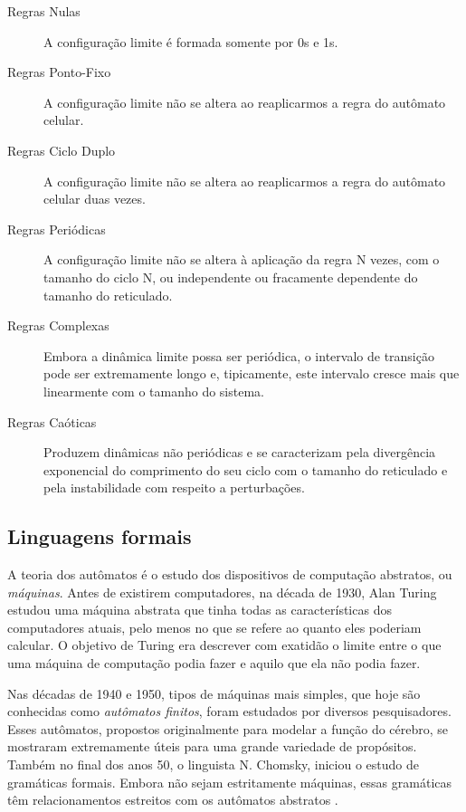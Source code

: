 \documentclass[12pt,a4paper]{article}
\begin{document}
\begin{description}
\item[Regras Nulas] A configuração limite é formada somente por 0s e 1s.

\item[Regras Ponto-Fixo] A configuração limite não se altera ao
reaplicarmos a regra do autômato celular.

\item[Regras Ciclo Duplo] A configuração limite não se altera ao
reaplicarmos a regra do autômato celular duas vezes.

\item[Regras Periódicas] A configuração limite não se altera à aplicação
da regra N vezes, com o tamanho do ciclo N, ou independente ou fracamente
dependente do tamanho do reticulado.

\item[Regras Complexas] Embora a dinâmica limite possa ser periódica,
o intervalo de transição pode ser extremamente longo e, tipicamente,
este intervalo cresce mais que linearmente com o tamanho do sistema.

\item[Regras Caóticas] Produzem dinâmicas não periódicas e se caracterizam
pela divergência exponencial do comprimento do seu ciclo com o tamanho do
reticulado e pela instabilidade com respeito a perturbações.
\end{description}

\subsection{Linguagens formais}

A teoria dos autômatos é o estudo dos dispositivos de computação abstratos,
ou \textit{máquinas}. Antes de existirem computadores, na década de 1930, Alan
Turing estudou uma máquina abstrata que tinha todas as características dos
computadores atuais, pelo menos no que se refere ao quanto eles poderiam 
calcular. O objetivo de Turing era descrever com exatidão o limite entre
o que uma máquina de computação podia fazer e aquilo que ela não podia fazer.

Nas décadas de 1940 e 1950, tipos de máquinas mais simples, que hoje são
conhecidas como \textit{autômatos finitos}, foram estudados por diversos
pesquisadores. Esses autômatos, propostos originalmente para modelar a
função do cérebro, se mostraram extremamente úteis para uma grande variedade
de propósitos. Também no final dos anos 50, o linguista N. Chomsky, iniciou
o estudo de gramáticas formais. Embora não sejam estritamente máquinas,
essas gramáticas têm relacionamentos estreitos com os autômatos abstratos
.
\end{document}
